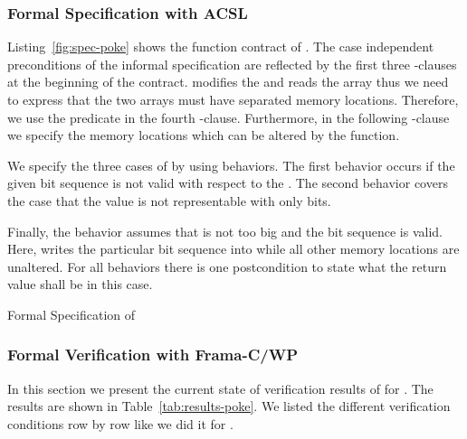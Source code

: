 \FloatBarrier

\subsubsection{Formal Specification with ACSL}
\label{formal-poke}

Listing~\ref{fig:spec-poke} shows the function contract of \poke.
The case independent preconditions of the informal specification 
are reflected by the  first three -clauses at the beginning of the contract.
\poke modifies the  and reads the array
 thus we need to express 
that the two arrays must have separated memory locations. 
Therefore, we use the predicate  in the fourth -clause.
Furthermore, in the following -clause we specify the memory locations which 
can be altered by the function.

We specify the three cases of \poke by using behaviors. 
The first behavior  occurs if the given bit sequence is not valid with respect to the . 
The second behavior  covers the case that the value  
is not representable with only  bits.

Finally, the behavior  assumes 
that  is not too big and the bit sequence is valid. 
Here, \poke writes the particular bit sequence into  
while all other memory locations are unaltered.
For all behaviors there is one postcondition to state what
the return value shall be in this case.


\begin{listing}[hbt]
\begin{minipage}{\textwidth}

\end{minipage}
\caption{\label{fig:spec-poke} Formal Specification of \poke}
\end{listing}



\FloatBarrier

\subsubsection{Formal Verification with Frama-C/WP}
\label{verification-poke}

In this section we present the current state of verification results of 
for \poke.
The results are shown in Table~\ref{tab:results-poke}.
 We listed the different verification conditions 
 row by row like we did it for \peek.

